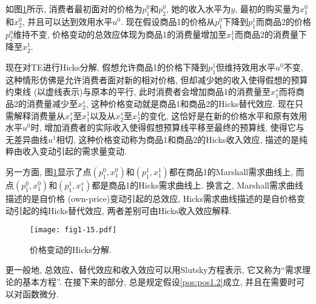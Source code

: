 \documentclass[cn, 12pt, math=mtpro2, bibstyle=apa, blue, twocol]{elegantbook}
\begin{document}
如图\ref{fig1.15}所示, 消费者最初面对的价格为$p_1^0$和$p_2^0$, 她的收入水平为$y$, 最初的购买量为$x_1^0$和$x_2^0$, 并且可以达到效用水平$u^0$. 现在假设商品1的价格从$p_1^0$下降到$p_1^1$而商品2的价格$p_2^0$维持不变, 价格变动的总效应体现为商品1的消费量增加至$x_1^1$而商品2的消费量下降至$x_2^1$.

现在对TE进行Hicks分解, 假想允许商品1的价格下降到$p_1^1$但维持效用水平$u^0$不变, 这种情形仿佛是允许消费者面对新的相对价格, 但却减少她的收入使得假想的预算约束线 (以虚线表示)与原本的平行, 此时消费者会增加商品1的消费量至$x_1^s$而将商品2的消费量减少至$x_2^s$, 这种价格变动就是商品1和商品2的Hicks替代效应. 现在只需解释消费量从$x_1^s$至$x_1^1$以及从$x_2^s$至$x_2^1$的变化, 这恰好是在新的价格水平和原有效用水平$u^0$时, 增加消费者的实际收入使得假想预算线平移至最终的预算线, 使得它与无差异曲线$u^1$相切, 这种价格变动称为商品1和商品2的Hicks收入效应, 描述的是纯粹由收入变动引起的需求量变动.

另一方面, 图\ref{fig1.15}显示了点$(p_1^0,x_1^0)$和$(p_1^1,x_1^1)$都在商品1的Marshall需求曲线上, 而点$(p_1^0,x_1^0)$和$(p_1^1,x_1^s)$都是商品1的Hicks需求曲线上. 换言之, Marshall需求曲线描述的是自价格 (own-price)变动引起的总效应, Hicks需求曲线描述的是自价格变动引起的纯Hicks替代效应, 两者差别可由Hicks收入效应解释.
\begin{figure}
  \centering
  \texttt{[image: fig1-15.pdf]}
  \caption{价格变动的Hicks分解.}\label{fig1.15}
\end{figure}

更一般地, 总效应、替代效应和收入效应可以用Slutsky方程表示, 它又称为“需求理论的基本方程”. 在接下来的部分, 总是规定假设\ref{pos:pos1.2}成立, 并且在需要时可以对函数微分.
\end{document}
